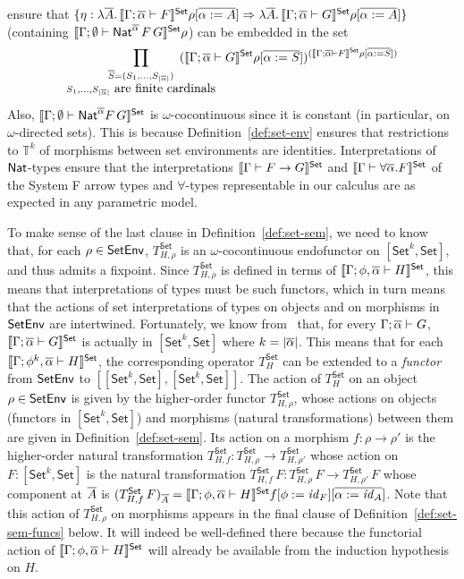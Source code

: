 \documentclass{lmcs}
\theoremstyle{plain}\newtheorem{satz}[thm]{Satz}
\newcommand{\set}{\mathsf{Set}}
\renewcommand{\id}{\mathit{id}}
\begin{document}
{ensure that $\{\eta : \lambda \ol{A}.\,\setsem{\Gamma;\ol{\alpha}
  \vdash F}\rho[\ol{\alpha := A}] \Rightarrow \lambda
\ol{A}.\,\setsem{\Gamma;\ol{\alpha} \vdash G}\rho[\ol{\alpha := A}]\}$
(containing $\setsem{\Gamma;\emptyset \vdash
  \Nat^{\ol{\alpha}}\,F\,G}\rho$) can be embedded in the set
\[ \prod_{\substack{\ol{S} =
    (S_1,...,S_{|\ol{\alpha}|})\\ S_1,...,S_{|\ol{\alpha}|} \mbox{ are
      finite cardinals}}} \hspace*{-0.4in}(\setsem{\Gamma;\ol{\alpha}
  \vdash G}\rho[\ol{\alpha := S}])^{(\setsem{\Gamma;\ol{\alpha} \vdash
    F}\rho[\ol{\alpha := S}])}\] Also, $\setsem{\Gamma; \emptyset
  \vdash \Nat^{\ol\alpha} F\,G}$ is $\omega$-cocontinuous since it is
constant (in particular, on $\omega$-directed sets). This is because
Definition~\ref{def:set-env} ensures that restrictions to
$\mathbb{T}^k$ of morphisms between set environments are identities.
Interpretations of $\mathsf{Nat}$-types ensure that the interpretations
$\setsem{\Gamma \vdash F \to G}$ and $\setsem{\Gamma \vdash \forall
  \ol\alpha. F}$ of the System F arrow types and $\forall$-types
representable in our calculus are as expected in any parametric model.

To make sense of the last clause in Definition~\ref{def:set-sem}, we
need to know that, for each $\rho \in \mathsf{SetEnv}$, $T^\set_{H,\rho}$ is
an $\omega$-cocontinuous endofunctor on $[\set^k, \set]$, and thus
admits a fixpoint.  Since $T_{H,\rho}^\set$ is defined in terms of
$\setsem{\Gamma;\phi, \ol{\alpha} \vdash H}$, this means that
interpretations of types must be such functors, which in turn means
that the actions of set interpretations of types on objects and on
morphisms in $\mathsf{SetEnv}$ are intertwined. Fortunately, we know
from~\cite{jp19} that, for every $\Gamma; \overline{\alpha} \vdash G$,
$\setsem{\Gamma; \ol{\alpha} \vdash G}$ is actually in $[\set^k,\set]$
where $k = |\overline{\alpha}|$. This means that for each $\setsem{\Gamma;
  \phi^k, \ol{\alpha} \vdash H}$, the corresponding operator
$T^\set_{H}$ can be extended to a {\em functor} from $\mathsf{SetEnv}$ to
$[[\set^k,\set],[\set^k,\set]]$. The action of $T^\set_H$ on an object
$\rho \in \mathsf{SetEnv}$ is given by the higher-order functor
$T_{H,\rho}^\set$, whose actions on objects (functors in $[\set^k,
  \set]$) and morphisms (natural transformations) between them are
given in Definition~\ref{def:set-sem}. Its action on a morphism $f :
\rho \to \rho'$ is the higher-order natural transformation
$T^\set_{H,f} : T^\set_{H,\rho} \to T^\set_{H,\rho'}$ whose action on
$F : [\set^k,\set]$ is the natural transformation $T^\set_{H,f}\, F :
T^\set_{H,\rho}\,F \to T^\set_{H,\rho'}\,F$ whose component at
$\overline{A}$ is $(T^\set_{H,f}\, F)_{\ol{A}} = \setsem{\Gamma;
  \phi,\ol{\alpha} \vdash H}f[\phi := \id_F][\ol{\alpha := \id_A}]$.
Note that this action of $T_{H,\rho}^\set$ on morphisms appears in the
final clause of Definition~\ref{def:set-sem-funcs} below. It will
indeed be well-defined there because the functorial action of
$\setsem{\Gamma; \phi,\ol{\alpha} \vdash H}$ will already be available
from the induction hypothesis on $H$.

}
\end{document}
